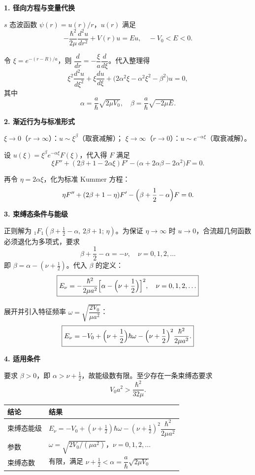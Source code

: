 \begin{derivationbox}[标准解题过程]
\textbf{1. 径向方程与变量代换}

$s$ 态波函数 $\psi(r)=u(r)/r$，$u(r)$ 满足
\[
-\frac{\hbar^2}{2\mu}\frac{d^2u}{dr^2}+V(r)u=Eu,\quad -V_0<E<0.
\]

令 $\xi=e^{-(r-R)/a}$，则 $\dfrac{d}{dr}=-\dfrac{\xi}{a}\dfrac{d}{d\xi}$。代入整理得
\begin{equation}
\xi^2\frac{d^2u}{d\xi^2}+\xi\frac{du}{d\xi}+\bigl(2\alpha^2\xi-\alpha^2\xi^2-\beta^2\bigr)u=0,
\end{equation}
其中
\[
\alpha=\frac{a}{\hbar}\sqrt{2\mu V_0},\quad \beta=\frac{a}{\hbar}\sqrt{-2\mu E}.
\]

\textbf{2. 渐近行为与标准形式}

$\xi\to0$（$r\to\infty$）：$u\sim\xi^\beta$（取衰减解）；
$\xi\to\infty$（$r\to0$）：$u\sim e^{-\alpha\xi}$（取衰减解）。

设 $u(\xi)=\xi^\beta e^{-\alpha\xi}F(\xi)$，代入得 $F$ 满足
\[
\xi F''+(2\beta+1-2\alpha\xi)F'-\bigl(\alpha+2\alpha\beta-2\alpha^2\bigr)F=0.
\]

再令 $\eta=2\alpha\xi$，化为标准 Kummer 方程：
\[
\eta F''+(2\beta+1-\eta)F'-\Bigl(\beta+\frac12-\alpha\Bigr)F=0.
\]

\textbf{3. 束缚态条件与能级}

正则解为 $_1F_1(\beta+\frac12-\alpha,\,2\beta+1;\,\eta)$。为保证 $\eta\to\infty$ 时 $u\to0$，合流超几何函数必须退化为多项式，要求
\[
\beta+\frac12-\alpha=-\nu,\quad \nu=0,1,2,\ldots
\]
即 $\beta=\alpha-(\nu+\frac12)$。代入 $\beta$ 的定义：
\begin{equation}
\boxed{E_\nu=-\frac{\hbar^2}{2\mu a^2}\Bigl[\alpha-\Bigl(\nu+\frac12\Bigr)\Bigr]^2,\quad \nu=0,1,2,\ldots}
\end{equation}

展开并引入特征频率 $\omega=\sqrt{\dfrac{2V_0}{\mu a^2}}$：
\begin{equation}
\boxed{E_\nu=-V_0+\Bigl(\nu+\frac12\Bigr)\hbar\omega-\Bigl(\nu+\frac12\Bigr)^2\frac{\hbar^2}{2\mu a^2}.}
\end{equation}

\textbf{4. 适用条件}

要求 $\beta>0$，即 $\alpha>\nu+\frac12$，故能级数有限。至少存在一条束缚态要求
\[
V_0a^2>\frac{\hbar^2}{32\mu}.
\]
\end{derivationbox}

\begin{formulabox}[答案汇总]
\begin{center}
\begin{tabular}{ll}
\toprule
\textbf{结论} & \textbf{结果} \\
\midrule
束缚态能级 & $E_\nu=-V_0+\left(\nu+\frac12\right)\hbar\omega-\left(\nu+\frac12\right)^2\dfrac{\hbar^2}{2\mu a^2}$ \\
参数 & $\omega=\sqrt{2V_0/(\mu a^2)}$，$\nu=0,1,2,\ldots$ \\
束缚态数 & 有限，满足 $\nu+\frac12<\alpha=\dfrac{a}{\hbar}\sqrt{2\mu V_0}$ \\
\bottomrule
\end{tabular}
\end{center}
\end{formulabox}

